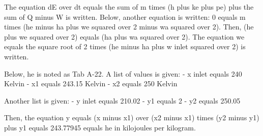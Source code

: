 The equation dE over dt equals the sum of m times (h plus ke plus pe) plus the sum of Q minus W is written. Below, another equation is written: 0 equals m times (he minus ha plus we squared over 2 minus wa squared over 2). Then, (he plus we squared over 2) equals (ha plus wa squared over 2). The equation we equals the square root of 2 times (he minus ha plus w inlet squared over 2) is written. 

Below, he is noted as Tab A-22. A list of values is given:
- x inlet equals 240 Kelvin
- x1 equals 243.15 Kelvin
- x2 equals 250 Kelvin

Another list is given:
- y inlet equals 210.02
- y1 equals 2
- y2 equals 250.05

Then, the equation y equals (x minus x1) over (x2 minus x1) times (y2 minus y1) plus y1 equals 243.77945 equals he in kilojoules per kilogram.